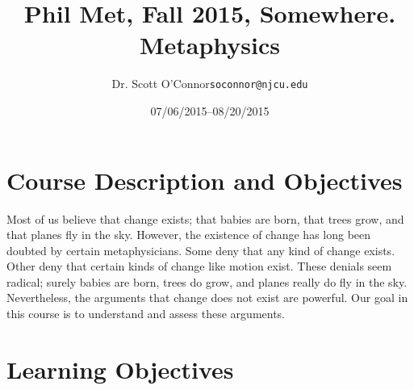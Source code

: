 \documentclass[11pt,article,oneside]{memoir}
\makeatletter
\def\myauthor{Author}
\def\mytitle{Title}
\def\mycopyright{\myauthor}
\def\myemail{soconnor@njcu.edu}
\def\myauthor{Dr. Scott O'Connor}
\def\mytitle{{\normalsize Phil Met, Fall 2015, Somewhere. \newline} \HUGE Metaphysics}
\makeatother
\begin{document}
\setsansfont[Mapping=tex-text]{Georgia} 
\setmonofont[Mapping=tex-text,Scale=0.8]{Georgia} 

\def\ind{\hangindent=1 true cm\hangafter=1 \noindent}
\def\labelitemi{$\cdot$}

\pagestyle{kjh}

\title{\LARGE \mytitle}     
\author{\Large\myauthor \newline \footnotesize\texttt{\noindent\myemail}}
\date{07/06/2015--08/20/2015}

\published{\,}

\maketitle




%
%

\section{Course Description and Objectives}

Most of us believe that change exists; that babies are born, that trees grow, and that planes fly in the sky. However, the existence of change has long been doubted by certain metaphysicians. Some deny that any kind of change exists. Other deny that certain kinds of change like motion exist. These denials seem radical; surely babies are born, trees do grow, and planes really do fly in the sky. Nevertheless, the arguments that change does not exist are powerful. Our goal in this course is to understand and assess these arguments. 


\section{Learning Objectives}
\end{document}
